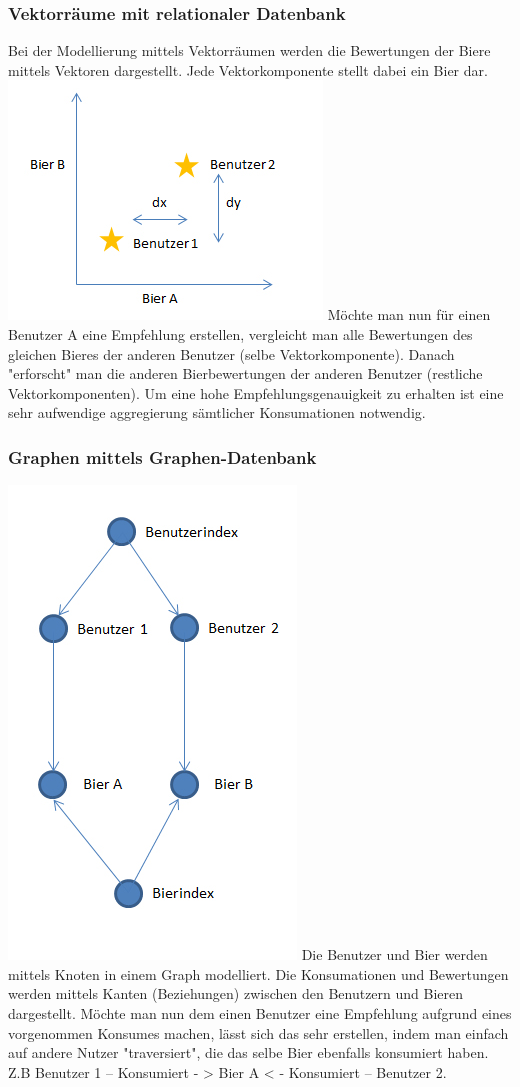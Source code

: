 \documentclass[10pt,a4paper]{scrartcl}
\begin{document}
\subsubsection{Vektorräume mit relationaler Datenbank}
Bei der Modellierung mittels Vektorräumen werden die Bewertungen der Biere mittels Vektoren dargestellt. Jede Vektorkomponente stellt dabei ein Bier dar.
\includegraphics[scale=1]{vektor.jpg} 
Möchte man nun für einen Benutzer A eine Empfehlung erstellen, vergleicht man alle Bewertungen des gleichen Bieres der anderen Benutzer (selbe Vektorkomponente). Danach "erforscht" man die anderen Bierbewertungen der anderen Benutzer (restliche Vektorkomponenten). Um eine hohe Empfehlungsgenauigkeit zu erhalten ist eine sehr aufwendige aggregierung sämtlicher Konsumationen notwendig. 
\subsubsection{Graphen mittels Graphen-Datenbank}
\includegraphics[scale=0.7]{graph.jpg} 
Die Benutzer und Bier werden mittels Knoten in einem Graph modelliert. Die Konsumationen und Bewertungen werden mittels Kanten (Beziehungen) zwischen den Benutzern und Bieren dargestellt. Möchte man nun dem einen Benutzer eine Empfehlung aufgrund eines vorgenommen Konsumes machen, lässt sich das sehr erstellen, indem man einfach auf andere Nutzer "traversiert", die das selbe Bier ebenfalls konsumiert haben.
Z.B Benutzer 1 -- Konsumiert - > Bier A < - Konsumiert -- Benutzer 2.
\end{document}
